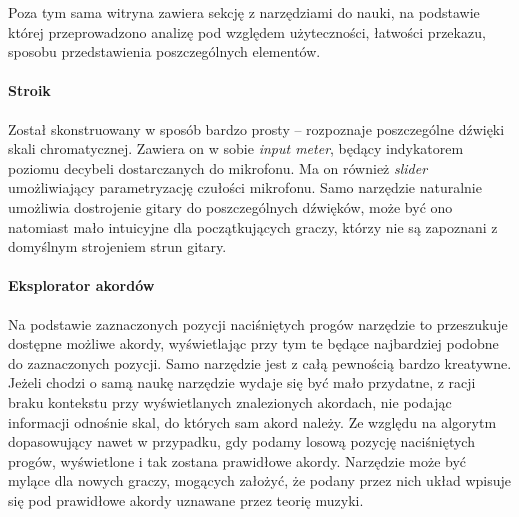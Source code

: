 Poza tym sama witryna zawiera sekcję z narzędziami do nauki, na podstawie której przeprowadzono analizę pod względem użyteczności, łatwości przekazu, sposobu przedstawienia poszczególnych elementów. 

\paragraph{Stroik}
Został skonstruowany w sposób bardzo prosty -- rozpoznaje poszczególne dźwięki skali chromatycznej. Zawiera on w sobie \emph{input meter}, będący indykatorem poziomu decybeli dostarczanych do mikrofonu. Ma on również \emph{slider} umożliwiający parametryzację czułości mikrofonu. Samo narzędzie naturalnie umożliwia dostrojenie gitary do poszczególnych dźwięków, może być ono natomiast mało intuicyjne dla początkujących graczy, którzy nie są zapoznani z domyślnym strojeniem strun gitary.

\paragraph{Eksplorator akordów}
Na podstawie zaznaczonych pozycji naciśniętych progów narzędzie to przeszukuje dostępne możliwe akordy, wyświetlając przy tym te będące najbardziej podobne do zaznaczonych pozycji. Samo narzędzie jest z całą pewnością bardzo kreatywne. Jeżeli chodzi o samą naukę narzędzie wydaje się być mało przydatne, z racji braku kontekstu przy wyświetlanych znalezionych akordach, nie podając informacji odnośnie skal, do których sam akord należy. Ze względu na algorytm dopasowujący nawet w przypadku, gdy podamy losową pozycję naciśniętych progów, wyświetlone i tak zostana prawidłowe akordy. Narzędzie może być mylące dla nowych graczy, mogących założyć, że podany przez nich układ wpisuje się pod prawidłowe akordy uznawane przez teorię muzyki.

